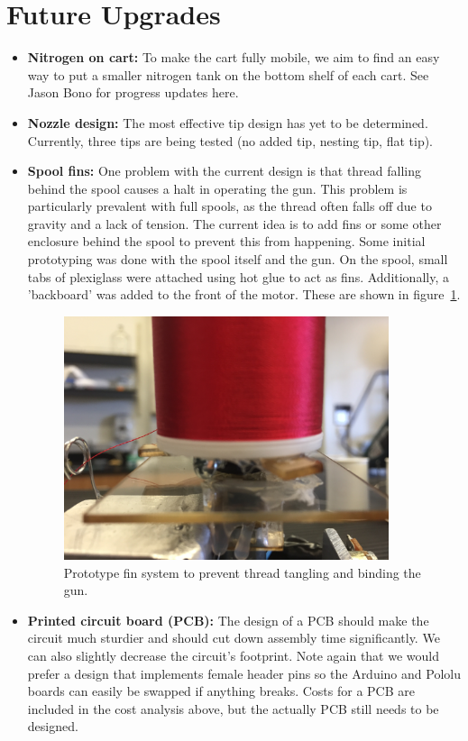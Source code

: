 \documentclass[letterpaper,12pt]{article}
\begin{document}
\section{Future Upgrades}
\begin{itemize}
\item{
\textbf{Nitrogen on cart:} To make the cart fully mobile, we aim to find an easy way to put a smaller nitrogen tank on the bottom shelf of each cart. See Jason Bono for progress updates here.
}
\item{
\textbf{Nozzle design:} The most effective tip design has yet to be determined. Currently, three tips are being tested (no added tip, nesting tip, flat tip).
}
\item{
\textbf{Spool fins:} One problem with the current design is that thread falling behind the spool causes a halt in operating the gun. This problem is particularly prevalent with full spools, as the thread often falls off due to gravity and a lack of tension. The current idea is to add fins or some other enclosure behind the spool to prevent this from happening. Some initial prototyping was done with the spool itself and the gun. On the spool, small tabs of plexiglass were attached using hot glue to act as fins. Additionally, a 'backboard' was added to the front of the motor. These are shown in figure~\ref{fig:fins}.
}
\begin{figure} [h!]
		\centering
		\includegraphics[width=0.9\textwidth]{fins_upgrade.JPG}
		\caption{Prototype fin system to prevent thread tangling and binding the gun.}
		\label{fig:fins}
\end{figure}
\item{
\textbf{Printed circuit board (PCB):} The design of a PCB should make the circuit much sturdier and should cut down assembly time significantly. We can also slightly decrease the circuit's footprint. Note again that we would prefer a design that implements female header pins so the Arduino and Pololu boards can easily be swapped if anything breaks. Costs for a PCB are included in the cost analysis above, but the actually PCB still needs to be designed.
}
\end{itemize}
\end{document}
